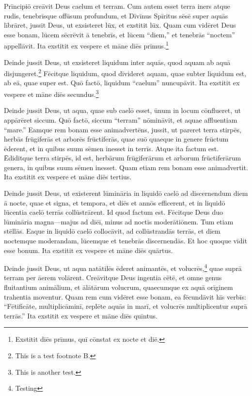 

\Caput
\Versus Prīncipiō creāvit Deus caelum et terram.
\Versus Cum autem esset terra iners atque rudis, tenebrīsque offūsum profundum, et Dīvīnus Spīritus sēsē super aquās lībrāret,
\Versus jussit Deus, ut exsisteret lūx, et exstitit lūx.
\Versus Quam cum vidēret Deus esse bonam, lūcem sēcrēvit ā tenebrīs,
\Versus et lūcem ``diem,'' et tenebrās ``noctem'' appellāvit. Ita exstitit ex vespere et māne diēs prīmus.\footnote{Exstitit diēs prīmus, quī cōnstat ex nocte et diē.}

\Versus Deinde jussit Deus, ut exsisteret liquidum inter aquās, quod aquam ab aquā disjungeret.\footnote{This is a test footnote B.}
\Versus Fēcitque liquidum, quod dīvideret aquam, quae subter liquidum est, ab eā, quae super est.
\Versus Quō factō, liquidum ``caelum'' nuncupāvit. Ita exstitit ex vespere et māne diēs secundus.\footnote{This is another test.}

\Versus Deinde jussit Deus, ut aqua, quae sub caelō esset, ūnum in locum cōnflueret, ut appārēret siccum.
\Versus Quō factō, siccum ``terram'' nōmināvit, et aquae affluentiam ``mare.'' Eamque rem bonam esse animadvertēns, 
\Versus jussit, ut pareret terra stirpēs, herbās frūgiferās et arborēs frūctiferās, quae suō quaeque in genere frūctum ēderent, et in quibus suum sēmen inesset in terrīs. Atque ita factum est.
\Versus Ēdiditque terra stirpēs, id est, herbārum frūgiferārum et arborum frūctiferārum genera, in quibus suum sēmen inesset. Quam etiam rem bonam esse animadvertit.
\Versus Ita exstitit ex vespere et māne diēs tertius.

\Versus Deinde jussit Deus, ut existerent lūmināria in liquidō caelō ad discernendum diem ā nocte, quae et signa, et tempora, et diēs et annōs efficerent,
\Versus et in liquidō lūcentia caelō terrās collūstrārent. Id quod factum est.
\Versus Fēcitque Deus duo lūmināria magna—majus ad diēī, minus ad noctīs moderātiōnem. Tum etiam stēllās.
\Versus Eaque in liquidō caelō collocāvit, ad collūstrandās terrās,
\Versus et diem noctemque moderandam, lūcemque et tenebrās discernendās. Et hoc quoque vīdit esse bonum.
\Versus Ita exstitit ex vespere et māne diēs quārtus.

\Versus Deinde jussit Deus, ut aqua natātilēs ēderet animantēs, et volucrēs,\footnote{Testing} quae suprā terram per āerem volārent.
\Versus Creāvitque Deus ingentia cētē, et omne genus fluitantium animālium, et ālātārum volucrum, quaecumque ex aquā orīginem trahentia moventur. Quam rem cum vidēret esse bonam,
\Versus ea fēcundāvit hīs verbīs: ``Fētificāte, multiplicāminī, replēte aquās in marī, et volucrēs multiplicentur suprā terrās.''
\Versus Ita exstitit ex vespere et māne diēs quīntus.

